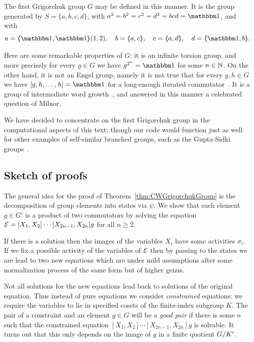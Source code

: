 \documentclass[a4paper,11pt]{amsart}
\begin{document}
The first Grigorchuk group $G$ may be defined in this manner. It is
the group generated by $S=\{a,b,c,d\}$, with $a^2=b^2=c^2=d^2=bcd=\id$,
and with
\[a=\pair{\id,\id}(1,2),\quad b=\pair{a,c},\quad c=\pair{a,d},\quad d=\pair{\id,b}. \]

Here are some remarkable properties of $G$: it is an infinite torsion
group, and more precisely for every $g\in G$ we have $g^{2^n}=\id$ for
some $n\in\mathbb{N}$. On the other hand, it is not an Engel group, namely it
is not true that for every $g,h\in G$ we have $[g,h,\dots,h]=\id$ for
a long-enough iterated commutator~\cite{Bartholdi:Engel}. It is a
group of intermediate word growth~\cite{Grigorchuk:Milnor}, and
answered in this manner a celebrated question of Milnor.

We have decided to concentrate on the first Grigorchuk group in the
computational aspects of this text; though our code would function
just as well for other examples of self-similar branched groups, such
as the Gupta-Sidki groups~\cite{Gupta-Sidki:PGroups}.


\subsection{Sketch of proofs}
The general idea for the proof of Theorem~\ref{thm:CWGrigorchukGroup}
is the decomposition of group elements into states via $\psi$. We show
that each element $g\in G'$ is a product of two commutators by solving
the equation $\mathcal{E}=[X_1,X_2]\cdots[X_{2n-1},X_{2n}]g$ for all
$n\geq 2$.

If there is a solution then the images of the variables $X_i$ have some 
activities $\sigma_i$. If we fix a possible activity
of the variables of $\mathcal{E}$ then by passing to the states we are lead to two new
equations which are under mild assumptions after some normalization process
of the same form but of higher genus. 

Not all solutions for the new equations lead back to solutions 
of the original equation. Thus instead of pure equations we consider
\emph{constrained} equations: we require the variables to lie in specified cosets of the finite-index subgroup $K$. The pair of a constraint and an element $g\in G$ 
will be a \emph{good pair} if there is some $n$ such that the 
constrained equation $[X_1,X_2]\cdots[X_{2n-1},X_{2n}]g$ is solvable.
It turns out that this only depends on the image of $g$ in a finite
quotient ${G/K'}$. 
\end{document}
